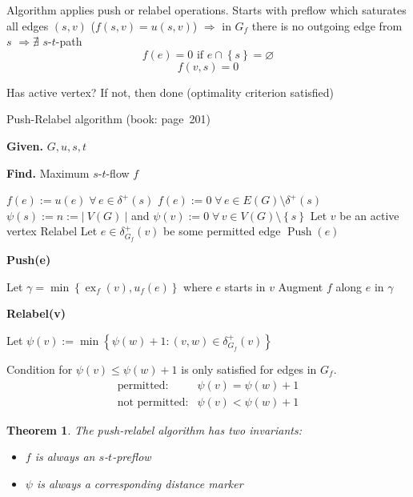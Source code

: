 \documentclass{article}
\newtheorem{theorem}{Theorem}
\newcommand{\card}[1]{\left|\:\!#1\:\!\right|}
\newcommand{\set}[1]{\left\{#1\right\}}
\newcommand{\given}[1]{\textbf{Given.} #1\par}
\newcommand{\find}[1]{\textbf{Find.} #1\par}
\newcommand{\gath}[2]{$#1$-$#2$-path} %
\newcommand{\flow}[2]{$#1$-$#2$-flow}
\newcommand{\fall}{\;\forall\,}
\begin{document}
Algorithm applies push or relabel operations. Starts with preflow which saturates all edges $(s, v)$ ($f(s,v) = u(s,v)$) $\Rightarrow$ in $G_f$ there is no outgoing edge from $s$ $\Rightarrow \nexists$ \gath st
\[
  f(e) = 0 \text{ if } e \cap \set{s} = \diameter
\] \[
  f(v,s) = 0
\]

Has active vertex? If not, then done (optimality criterion satisfied)

\begin{algorithm}
  \caption{Push-Relabel algorithm (book: page~201)}
  \label{push-relabel-algo}
  \given{$G, u, s, t$}
  \find{Maximum \flow st $f$}
\begin{algorithmic}[1]
  \State $f(e) := u(e) \fall e \in \delta^+(s)$
  \State $f(e) := 0 \fall e \in E(G) \setminus \delta^+(s)$
  \State $\psi(s) := n := \card{V(G)}$ and $\psi(v) := 0 \fall v \in V(G) \setminus \set{s}$
    \State Let $v$ be an active vertex
      \State Relabel
    \Else
      \State Let $e \in \delta_{G_f}^+(v)$ be some permitted edge
      \State $\operatorname{Push}(e)$
    \EndIf
  \EndWhile
\end{algorithmic}
\textbf{Push(e)}
\begin{algorithmic}[1]
  \State Let $\gamma = \min\set{\operatorname{ex}_f(v), u_f(e)}$ where $e$ starts in $v$
  \State Augment $f$ along $e$ in $\gamma$
\end{algorithmic}
\textbf{Relabel(v)}
\begin{algorithmic}[1]
  \State Let $\psi(v) := \min\set{\psi(w) + 1: (v, w) \in \delta^+_{G_f}(v)}$
\end{algorithmic}
\end{algorithm}

Condition for $\psi(v) \leq \psi(w) + 1$ is only satisfied for edges in $G_f$.
\[
  \begin{array}{ll}
    \text{permitted:} & \psi(v) = \psi(w) + 1 \\
    \text{not permitted:} & \psi(v) < \psi(w) + 1
  \end{array}
\]

\begin{theorem}\label{proposition-4.8}
  The push-relabel algorithm has two invariants:
  \begin{itemize}
    \item $f$ is always an $s$-$t$-preflow
    \item $\psi$ is always a corresponding distance marker
  \end{itemize}
\end{theorem}
\end{document}
